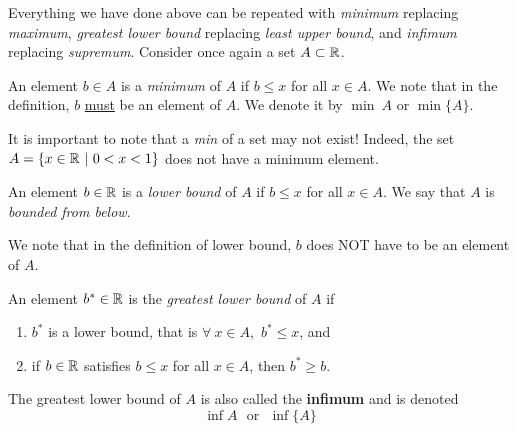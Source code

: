 Everything we have done above can be repeated with \emph{minimum} replacing \emph{maximum}, \emph{greatest lower bound} replacing \emph{least upper bound}, and \emph{infimum} replacing \emph{supremum}. Consider once again a set $A \subset \mathbb R$.\\

\begin{definition}
An element $b\in A$ is a \emph{minimum} of $A$ if $b \le x$ for all  $x\in A$.
We note that in the definition,  $b$ \underline{must} be an element of $A$. We denote it by $\min~A$ or $\min \{ A\}$. \\
\end{definition}

It is important to note that a \emph{min} of a set may not exist! Indeed, the set $A = \{  x\in \mathbb R~|~ 0  < x < 1\}$ does not have a minimum element.\\

\begin{definition}
An element $b\in \mathbb R$ is a \emph{lower  bound} of $A$ if $b\le x$ for all  $x\in A$.  We say that $A$  is \emph{bounded from below}.
\end{definition}

\begin{rem}
 We note that in the definition of lower bound,  $b$ does NOT have to be an element of $A$.
\end{rem}

\begin{definition}
An element $b^*\in \mathbb R$ is the \emph{greatest lower bound} of $A$ if
\vspace*{0.2cm}
\begin{enumerate}
\item $b^*$ is a lower bound, that is $\forall ~x\in A$,~$b^* \le x$, and
\item  if $b\in \mathbb R$ satisfies $b\le x$ for all $x\in A$, then $b^* \ge b$.
\end{enumerate}
\end{definition}

\begin{notvocab}The greatest lower bound of $A$ is also called the \textbf{infimum} and is denoted
$$\inf A~~~\mbox{or}~~~\inf\{A\}$$
\end{notvocab} 



\begin{center}

    
\end{center}
\vspace*{.5cm} 




